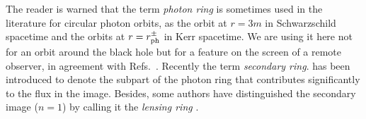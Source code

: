 \begin{remark}
The reader is warned that the term \emph{photon ring} is sometimes used in
the literature for circular photon orbits, as the orbit at $r=3m$ in Schwarzschild spacetime
and the orbits at $r=r_{\rm ph}^\pm$ in Kerr spacetime. We are using it here
not for an orbit around the black hole but for a feature on the screen of a remote observer,
in agreement with Refs.~\cite{BeckwD05,JohanP10,Johns_al20,GrallL20a,GrallL20c}.
Recently the term \emph{secondary ring}. has been introduced
\cite{VinceWAGLPG21} to denote the subpart of the photon ring that contributes
significantly to the flux in the image.
Besides, some authors have distinguished the secondary image ($n=1$)
by calling it the \emph{lensing ring} \cite{GrallHW19}.
\end{remark}

